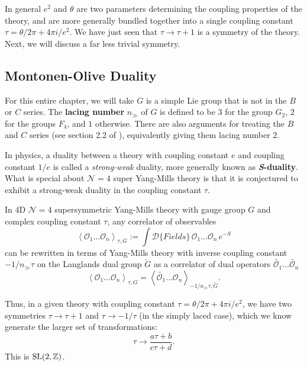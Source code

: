 In general $e^2$ and $\theta$ are two parameters determining the coupling properties of the theory, and are more generally bundled together into a single coupling constant $\tau = \theta/2\pi + 4\pi i/e^2$. We have just seen that $\tau \to \tau+1$ is a symmetry of the theory. Next, we will discuss a far less trivial symmetry. 


\subsection{Montonen-Olive Duality} %
\label{sub:montonen_olive_duality}

	For this entire chapter, we will take $G$ is a simple Lie group that is not in the $B$ or $C$ series. The \textbf{lacing number} $n_{\gg}$ of $G$ is defined to be $3$ for the group $G_2$, $2$ for the groups $F_4$, and $1$ otherwise. There are also arguments for treating the $B$ and $C$ series (see section 2.2 of \cite{kapustin2006}), equivalently giving them lacing number $2$.

	In physics, a duality between a theory with coupling constant $e$ and coupling constant $1/e$ is called a \emph{strong-weak} duality, more generally known as \textbf{\emph{S}-duality}. What is special about $\mathcal N=4$ super Yang-Mills theory is that it is conjectured to exhibit a strong-weak duality in the coupling constant $\tau$. 
	

	\begin{concept}
		In 4D $\mathcal N = 4$ supersymmetric Yang-Mills theory with gauge group $G$ and complex coupling constant $\tau$, any correlator of observables
		\[
			\left< \mathcal O_1 \dots \mathcal O_n \right>_{\tau, G} := \int \mathcal{D}\{ Fields \}\, \mathcal O_1 \dots \mathcal O_n \, e^{-S}
		\]
		can be rewritten in terms of Yang-Mills theory with inverse coupling constant $-1/n_{\gg} \tau$ on the Langlands dual group $\check G$ as a correlator of dual operators $\tilde {\mathcal O_1} \dots \tilde {\mathcal O_n}$
		\[
			\left< \mathcal O_1 \dots \mathcal O_n \right>_{\tau, G} = \left< \tilde{\mathcal O_1} \dots \mathcal O_n \right>_{-1/n_\gg \tau, \check G}.
		\]
	\end{concept}
	
	Thus, in a given theory with coupling constant $\tau = \theta/2\pi + 4\pi i/e^2$, we have two symmetries $\tau \to \tau+1$ and $\tau \to -1/\tau$ (in the simply laced case), which we know generate the larger set of transformations:
	\[
		\tau \to \frac{a \tau + b}{c \tau + d}.
	\]
	This is $\mathrm{SL}(2, \mathbb{Z})$.
	
